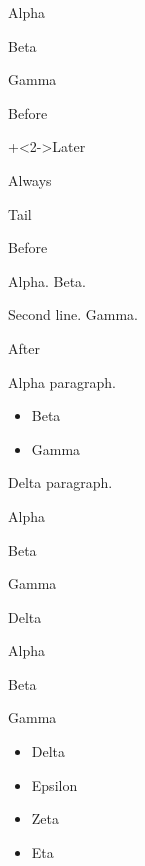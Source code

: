 \documentclass[aspectratio=169]{beamer}
\begin{document}
\begin{frame}[plain,t]
  Alpha\par
  Beta\par
  Gamma\par
\end{frame}
\begin{frame}[plain,t]
  Before\par
  \onslide+<2->Later\par
  \onslide Always\par
  \par
   Tail\par
\end{frame}
\begin{frame}[plain,t]
  Before\par
  \begin{overprint}[120pt]
    Alpha.
    Beta.\par Second line.
    Gamma.
  \end{overprint}\par
  After\par
\end{frame}
\begin{frame}[plain,t]
  \begin{small}
    Alpha paragraph.
    \begin{itemize}
      \setlength{\itemsep}{1em}
      \item Beta
      \item Gamma
    \end{itemize}
  \end{small}
  Delta paragraph.
\end{frame}
\begin{frame}[t]
  \begin{small}Alpha\par
    \begin{footnotesize}Beta\par\end{footnotesize}
    Gamma\par
  \end{small}
  Delta\par
\end{frame}
\begin{frame}[plain,t]
  \small Alpha\par Beta\par
  \normalsize Gamma\par
  \begin{itemize}
    \setlength{\itemsep}{5pt plus 2pt minus 1pt}
    \item Delta
    \item Epsilon
  \end{itemize}
  \begin{itemize}\item Zeta\item Eta\end{itemize}
\end{frame}
\end{document}
